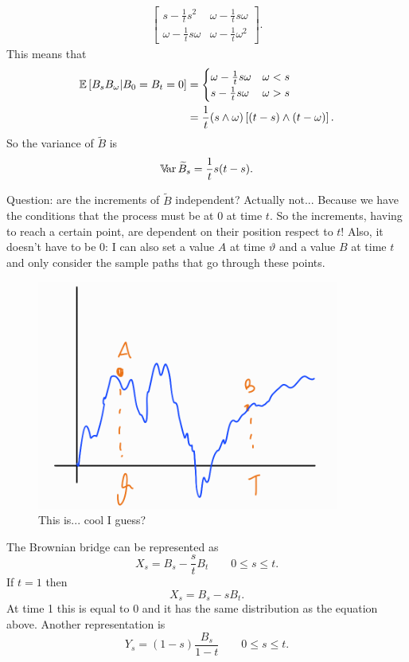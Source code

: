 \documentclass[12pt]{report}
\begin{document}
\begin{fancyproof}
\begin{align*}
\begin{bmatrix}
			s-\frac{1}{t}s^{2}&\omega-\frac{1}{t}s\omega\\
			\omega-\frac{1}{t}s\omega&\omega-\frac{1}{t}\omega^{2}
		\end{bmatrix}.
	\end{align*}
	This means that 
	\begin{align*}
		\mathbb{E}\left[B_{s}B_{\omega}|B_{0}=B_{t}=0\right]&=\begin{cases}
			\omega-\frac{1}{t}s\omega&\omega<s\\
			s-\frac{1}{t}s\omega&\omega>s
		\end{cases}\\
		&=\frac{1}{t}(s\wedge\omega)\left[(t-s)\wedge(t-\omega)\right].
	\end{align*}
	So the variance of $\widetilde{B}$ is
	\begin{equation*}
		\mathbb{V}\!\mathrm{ar}\,\widetilde{B}_{s}=\frac{1}{t}s(t-s).
	\end{equation*}
\end{fancyproof} 
Question: are the increments of $\widetilde{B}$ independent? Actually not... Because we have the conditions that the process must be at 0 at time $t$. So the increments, having to reach a certain point, are dependent on their position respect to $t$! Also, it doesn't have to be 0: I can also set a value $A$ at time $\vartheta$ and a value $B$ at time $t$ and only consider the sample paths that go through these points.
\begin{figure}[h]
	\centering
	\includegraphics[width=0.4\linewidth]{img/screenshot037}
	\caption{This is... cool I guess?}
	\label{fig:screenshot037}
\end{figure}
\begin{remark}
	The Brownian bridge can be represented as 
	\begin{equation*}
		X_{s}=B_{s}-\frac{s}{t}B_{t}\qquad0\leq s\leq t.
	\end{equation*}
	If $t=1$ then
	\begin{equation*}
		X_{s}=B_{s}-sB_{t}.
	\end{equation*}
	At time 1 this is equal to 0 and it has the same distribution as the equation above. Another representation is
	\begin{equation*}
		Y_{s}=(1-s)\frac{B_{s}}{1-t}\qquad0\leq s\leq t.
	\end{equation*}
\end{remark}
\end{document}
